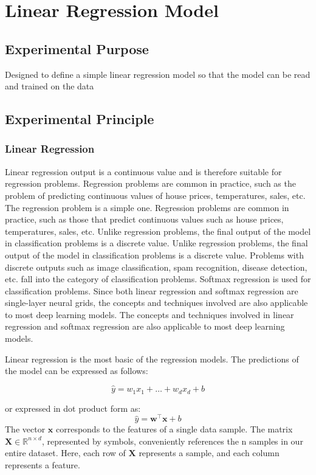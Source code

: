 \documentclass[a4paper,12pt]{article}
\begin{document}
\section{Linear Regression Model}
\subsection{Experimental Purpose}
Designed to define a simple linear regression model so that the model can be read and trained on the data

\subsection{Experimental Principle}
\subsubsection{Linear Regression}
Linear regression output is a continuous value and is therefore suitable for regression problems. Regression problems are common in practice, such as the problem of predicting continuous values of house prices, temperatures, sales, etc. The regression problem is a simple one.
Regression problems are common in practice, such as those that predict continuous values such as house prices, temperatures, sales, etc. Unlike regression problems, the final output of the model in classification problems is a discrete value. Unlike regression problems, the final output of the model in classification problems is a discrete value.
Problems with discrete outputs such as image classification, spam recognition, disease detection, etc. fall into the category of classification problems.
Softmax regression is used for classification problems. Since both linear regression and softmax regression are single-layer neural grids, the concepts and techniques involved are also applicable to most deep learning models.
The concepts and techniques involved in linear regression and softmax regression are also applicable to most deep learning models.

Linear regression is the most basic of the regression models. The predictions of the model can be expressed as follows:

\begin{equation}
\hat{y} = w_1x_1 + \dots + w_dx_d + b
\end{equation}

or expressed in dot product form as:
\begin{equation}
\hat{y} = \mathbf{w}^\top \mathbf{x} + b
\end{equation}
The vector \( \mathbf{x} \) corresponds to the features of a single data sample. The matrix \( \mathbf{X} \in \mathbb{R}^{n \times d} \), represented by symbols, conveniently references the n samples in our entire dataset. Here, each row of \( \mathbf{X} \) represents a sample, and each column represents a feature.
\end{document}
